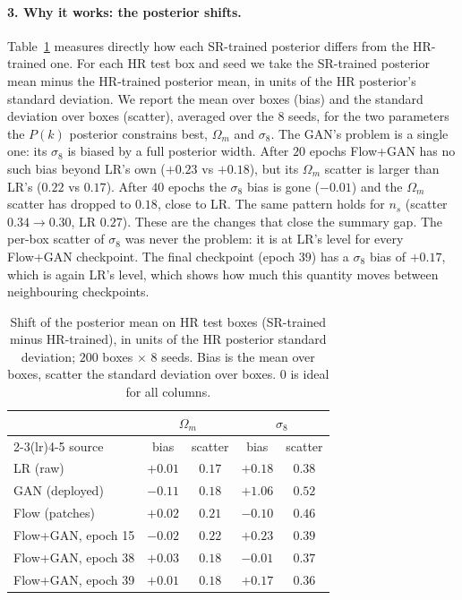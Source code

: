\paragraph{3. Why it works: the posterior shifts.} Table~\ref{tab:fg-s8}
measures directly how each SR-trained posterior differs from the HR-trained one.
For each HR test box and seed we take the SR-trained posterior mean minus the
HR-trained posterior mean, in units of the HR posterior's standard deviation. We
report the mean over boxes (bias) and the standard deviation over boxes (scatter),
averaged over the $8$ seeds, for the two parameters the $P(k)$ posterior
constrains best, $\Omega_m$ and $\sigma_8$. The GAN's problem is a single one:
its $\sigma_8$ is biased by a full posterior width. After $20$ epochs Flow+GAN has
no such bias beyond LR's own ($+0.23$ vs $+0.18$), but its $\Omega_m$ scatter is
larger than LR's ($0.22$ vs $0.17$). After $40$ epochs the $\sigma_8$ bias is gone
($-0.01$) and the $\Omega_m$ scatter has dropped to $0.18$, close to LR. The same
pattern holds for $n_s$ (scatter $0.34\to0.30$, LR $0.27$). These are the changes
that close the summary gap. The per-box scatter of $\sigma_8$ was never the
problem: it is at LR's level for every Flow+GAN checkpoint. The final checkpoint
(epoch $39$) has a $\sigma_8$ bias of $+0.17$, which is again LR's level, which
shows how much this quantity moves between neighbouring checkpoints.

\begin{table}[h]
\centering
\caption{Shift of the posterior mean on HR test boxes (SR-trained minus
HR-trained), in units of the HR posterior standard deviation; $200$ boxes
$\times$ $8$ seeds. Bias is the mean over boxes, scatter the standard deviation
over boxes. $0$ is ideal for all columns.}
\label{tab:fg-s8}
\begin{tabular}{lcccc}
\toprule
 & \multicolumn{2}{c}{$\Omega_m$} & \multicolumn{2}{c}{$\sigma_8$} \\
\cmidrule(lr){2-3}\cmidrule(lr){4-5}
source & bias & scatter & bias & scatter \\
\midrule
LR (raw)  & $+0.01$ & $\mathbf{0.17}$ & $+0.18$ & $0.38$ \\
GAN (deployed) & $-0.11$ & $0.18$ & $+1.06$ & $0.52$ \\
Flow (patches) & $+0.02$ & $0.21$ & $-0.10$ & $0.46$ \\
Flow+GAN, epoch 15 & $-0.02$ & $0.22$ & $+0.23$ & $0.39$ \\
Flow+GAN, epoch 38 & $+0.03$ & $0.18$ & $\mathbf{-0.01}$ & $0.37$ \\
Flow+GAN, epoch 39 & $+0.01$ & $0.18$ & $+0.17$ & $\mathbf{0.36}$ \\
\bottomrule
\end{tabular}
\end{table}

